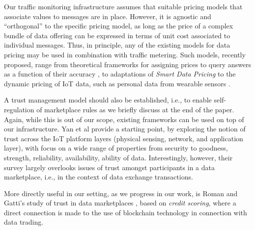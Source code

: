 \documentclass[chi_draft]{sigchi}
\begin{document}
Our traffic monitoring infrastructure assumes that suitable pricing models that associate values to messages are in place.
However, it is agnostic and ``orthogonal'' to the specific pricing model, as long as the price of a complex bundle of data offering can be expressed in terms of unit cost associated to individual messages. 
Thus, in principle, any of the existing models for data pricing may be used in combination with traffic metering. Such models, recently proposed, range from theoretical frameworks for assigning prices to query answers as a function of their accuracy \cite{Li:2014:TPP:2691190.2691191}, to adaptations of \textit{Smart Data Pricing} \cite{Sen:2015:SDP:2847579.2756543} to the dynamic pricing of IoT data, such as personal data from wearable sensors \cite{7437020}.

A trust management model should also be established, i.e., to enable self-regulation of marketplace rules as we briefly discuss at the end of the paper.
Again, while this is out of our scope, existing frameworks can be used on top of our infrastructure.
Yan et al \cite{Yan2014a} provide a starting point, by exploring the notion of trust across the IoT platform layers (physical sensing, network, and application layer), with focus on  a wide range of properties from security to goodness, strength, reliability, availability, ability of data. Interestingly, however, their survey largely overlooks issues of trust amongst participants in a data marketplace, i.e., in the context of data exchange transactions.

More directly useful in our setting, as we progress in our work, is Roman and Gatti's study of trust in data marketplaces \cite{7573695}, based on \textit{credit scoring}, where a direct connection is made to the use of blockchain technology in connection with data trading.

\end{document}

